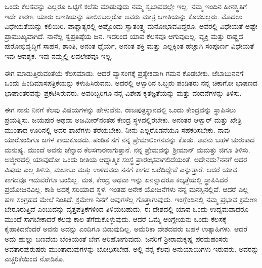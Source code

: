 \vspace{0.1cm}

ಒಂದು ಕೆಲಸವನ್ನು ಎಲ್ಲರೂ ಒಟ್ಟಿಗೆ ಕಲೆತು ಮಾಡುವುದು ನಮ್ಮ ಸ್ವಭಾವದಲ್ಲೇ ಇಲ್ಲ. ನಮ್ಮ ಇಂದಿನ ಹೀನಸ್ಥಿತಿಗೆ ಇದೇ ಕಾರಣ. ಯಾರು ಆಣತಿಯನ್ನು ಪಾಲಿಸಬಲ್ಲರೋ ಅವರು ಮಾತ್ರ ಆಣತಿಯನ್ನು ಕೊಡಬಲ್ಲರು. ಮೊದಲು ವಿಧೇಯತೆಯನ್ನು ಕಲಿಯಿರಿ. ಪಾಶ್ಚಾತ್ಯರಲ್ಲಿ ಅಷ್ಟೊಂದು ಸ್ವಾತಂತ್ರ್ಯ ಮನೋಭಾವವಿದ್ದರೂ, ಅವರಲ್ಲಿ ವಿಧೇಯತೆ ಅಷ್ಟೇ ಪ್ರಾಮುಖ್ಯವಾಗಿದೆ. ನಾನೆಲ್ಲ ಸ್ವಪ್ರತಿಷ್ಠೆಯ ಜನ. ಇದರಿಂದ ಯಾವ ಕೆಲಸವೂ ಆಗುವುದಿಲ್ಲ. ವ್ಯಕ್ತಿ ಮತ್ತು ರಾಷ್ಟ್ರದ ಪುರೋಭಿವೃದ್ಧಿಗೆ ಸಾಹಸ, ಶಾಂತಿ, ಅನಂತ ಧೈರ್ಯ, ಅನಂತ ಶಕ್ತಿ ಮತ್ತು ಎಲ್ಲಕ್ಕಿಂತ ಹೆಚ್ಚಾಗಿ ಸಂಪೂರ್ಣ ವಿಧೇಯತೆ \enginline{-} ಇವು ಆವಶ್ಯಕ. ಇವು ನಮ್ಮಲ್ಲಿ ಲವಲೇಶವೂ ಇಲ್ಲ.

\vspace{0.1cm}


ಈಗ ಮಾಡುತ್ತಿರುವಂತೆಯೆ ಕೆಲಸಮಾಡು. ಆದರೆ ವ್ಯಾಸಂಗಕ್ಕೆ ಪ್ರತ್ಯೇಕವಾಗಿ ಗಮನ ಕೊಡಬೇಕು. ಜೆ\enginline{-}ಬಾಬುನನಗೆ ಒಂದು ಹಿಂದಿಮಾಸಪತ್ರಿಕೆಯನ್ನು ಕಳುಹಿಸಿರುವನು. ಅದರಲ್ಲಿ ಆಳ್ವಾರಿನ ಒಬ್ಬರು ಪಂಡಿತರು ನನ್ನ ಚಿಕಾಗೋ ಭಾಷಣದ ಭಾಷಾಂತರವನ್ನು ಪ್ರಕಟಿಸಿರುವರು. ಅವರಿಬ್ಬರಿಗೂ ನನ್ನ ವಿಶೇಷ ಕೃತಜ್ಞತೆಯನ್ನು ಮತ್ತು ವಂದನೆಗಳನ್ನು ತಿಳಿಸು.

\vspace{0.1cm}

ಈಗ ನಾನು ನಿನಗೆ ಕೆಲವು ವಿಷಯಗಳನ್ನು ಹೇಳುವೆನು. ರಾಜಪುತ್ರಸ್ಥಾನದಲ್ಲಿ ಒಂದು ಕೇಂದ್ರವನ್ನು ಸ್ಥಾಪಿಸಲು ಪ್ರಯತ್ನಿಸು. ಜಯಪುರ ಅಥವಾ ಅಜಮೀರ್‌ನಂತಹ ಕೇಂದ್ರ ಸ್ಥಳದಲ್ಲಿರಬೇಕು. ಅನಂತರ ಆಳ್ವಾರ್ ಮತ್ತು ಖೇತ್ರಿ ಮುಂತಾದ ಊರಿನಲ್ಲಿ ಅದರ ಶಾಖೆಗಳು ತೆರೆಯಬೇಕು. ನೀನು ಎಲ್ಲರೊಡನೆಯೂ ಸಹಕರಿಸಬೇಕು. ನಾವು ಯಾರೊಂದಿಗೂ ಜಗಳ ಕಾಯಕೂಡದು. ಪಂಡಿತ ನ\enginline{-}ಗೆ ನನ್ನ ಪ್ರೇಮಾಲಿಂಗನವನ್ನು ಕೊಡು. ಅವನು ಬಹಳ ಚುರುಕಾದ ಮನುಷ್ಯ. ಮುಂದೆ ಅವನು ಚೆನ್ನಾದ ಕೆಲಸಗಾರನಾಗುತ್ತಾನೆ. ನನ್ನ ಪ್ರೇಮವನ್ನು ಶ‍್ರೀಮಾನ್ ಮ\enginline{-}ಮತ್ತು ಜಿ\enginline{-}ಗೂ ತಿಳಿಸು. ಅಜ್ಮೀರದಲ್ಲಿ ಯಾವುದೋ ಒಂದು ರೀತಿಯ ಆಧ್ಯಾತ್ಮಿಕ ಸಂಸ್ಥೆ ಪ್ರಾರಂಭವಾಗಲಿದೆಯಂತೆ. ಅದೇನದು?ನನಗೆ ಅದರ ವಿಷಯ ಎಲ್ಲ ತಿಳಿಸು, ಮ\enginline{-}ಬಾಬು ಮತ್ತು ಉಳಿದವರು ನನಗೆ ಕಾಗದ ಬರೆದಿದ್ದೇವೆ ಎನ್ನುತ್ತಾರೆ. ಆದರೆ ಯಾವ ಕಾಗದವೂ ಇದುವರೆಗೂ ಬಂದಿಲ್ಲ. ಮಠ, ಕೇಂದ್ರ ಅಥವಾ ಇನ್ನು ಏನನ್ನಾದರೂ ಕಲ್ಕತ್ತೆಯಲ್ಲಿ ಸ್ಥಾಪಿಸಿದರೆ ಪ್ರಯೋಜನವಿಲ್ಲ. ಕಾಶಿ ಅದಕ್ಕೆ ಸರಿಯಾದ ಸ್ಥಳ. ಇಂತಹ ಅನೇಕ ಯೋಜನೆಗಳು ನನ್ನ ಮನಸ್ಸಿನಲ್ಲಿವೆ. ಆದರೆ ಎಲ್ಲ ಹಣ ಸಂಗ್ರಹದ ಮೇಲೆ ನಿಂತಿದೆ. ಕ್ರಮೇಣ ನಿನಗೆ ಅವುಗಳೆಲ್ಲ ಗೊತ್ತಾಗುವುದು. ಇಂಗ್ಲೆಂಡಿನಲ್ಲಿ ನಮ್ಮ ಪ್ರಭಾವ ಕ್ರಮೇಣ ಬೇರೂರುತ್ತಿದೆ ಎಂಬುದನ್ನು ವೃತ್ತಪತ್ರಿಕೆಗಳಿಂದ ತಿಳಿಯಬಹುದು. ಈ ದೇಶದಲ್ಲಿ ಯಾವ ಒಂದು ಉದ್ಯಮವಾದರೂ ಮುಂದೆ ಸಾಗಬೇಕಾದರೆ ಕೆಲವು ಕಾಲ ತೆಗೆದುಕೊಳ್ಳುವುದು. ಆದರೆ ಒಮ್ಮೆ ಆಂಗ್ಲೇಯನು ಒಂದು ಕೆಲಸಕ್ಕೆ ಕೈಹಾಕಿದನೆಂದರೆ ಅವನು ಅದನ್ನು ಎಂದಿಗೂ ಬಿಡುವುದಿಲ್ಲ. ಅಮೆರಿಕಾ ದೇಶದವರು ಬಹಳ ಉತ್ಸಾಹಿಗಳು. ಆದರೆ ಅದು ಹುಲ್ಲು ಬಣವೆಯ ಬೆಂಕಿಯಂತೆ ಬೇಗ ಆರಿಹೋಗುವುದು. ಜನರಿಗೆ ಶ‍್ರೀರಾಮಕೃಷ್ಣ ಪರಮಹಂಸರು ಅವತಾರಪುರುಷರು ಮುಂತಾದುವುಗಳನ್ನು ಬೋಧಿಸಬೇಡ. ಅಲ್ಲಿ ನನ್ನ ಕೆಲವು ಅನುಯಾಯಿಗಳು ಇರುವರು. ಅವರನ್ನು ಎಚ್ಚರಿಕೆಯಿಂದ ನೋಡಿಕೊ.

\vspace{0.1cm}

